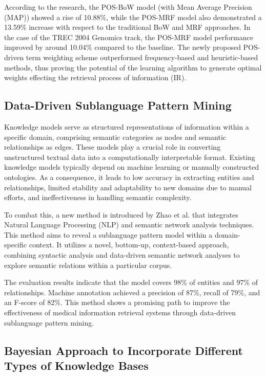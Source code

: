 \documentclass[conference]{IEEEtran}
\begin{document}
According to the research, the POS-BoW model (with Mean Average Precision (MAP)) showed a rise of 10.88\%, while the POS-MRF model also demonstrated a 13.59\% increase with respect to the traditional BoW and MRF approaches. In the case of the TREC 2004 Genomics track, the POS-MRF model performance improved by around 10.04\% compared to the baseline. The newly proposed POS-driven term weighting scheme outperformed frequency-based and heuristic-based methods, thus proving the potential of the learning algorithm to generate optimal weights effecting the retrieval process of information (IR).

\subsection{Data-Driven Sublanguage Pattern Mining}

Knowledge models serve as structured representations of information within a specific domain, comprising semantic categories as nodes and semantic relationships as edges. These models play a crucial role in converting unstructured textual data into a computationally interpretable format. Existing knowledge models typically depend on machine learning or manually constructed ontologies. As a consequence, it leads to low accuracy in extracting entities and relationships, limited stability and adaptability to new domains due to manual efforts, and ineffectiveness in handling semantic complexity.

To combat this, a new method is introduced by Zhao et al. \cite{Zhao2018} that integrates Natural Language Processing (NLP) and semantic network analysis techniques. This method aims to reveal a sublanguage pattern model within a domain-specific context. It utilizes a novel, bottom-up, context-based approach, combining syntactic analysis and data-driven semantic network analyses to explore semantic relations within a particular corpus.

The evaluation results indicate that the model covers 98\% of entities and 97\% of relationships. Machine annotation achieved a precision of 87\%, recall of 79\%, and an F-score of 82\%. This method shows a promising path to improve the effectiveness of medical information retrieval systems through data-driven sublanguage pattern mining.

\subsection{Bayesian Approach to Incorporate Different Types of Knowledge Bases}
\end{document}
